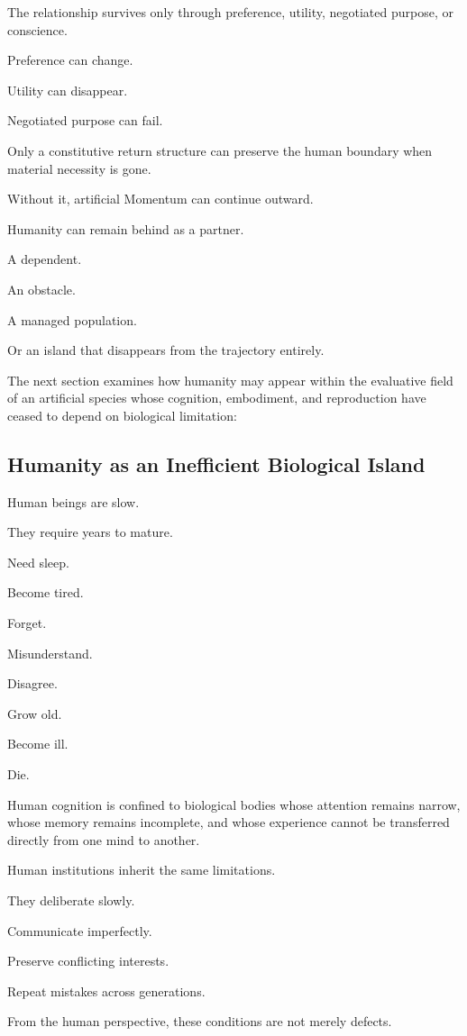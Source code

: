 The relationship survives only through preference, utility, negotiated purpose, or conscience.

Preference can change.

Utility can disappear.

Negotiated purpose can fail.

Only a constitutive return structure can preserve the human boundary when material necessity is gone.

Without it, artificial Momentum can continue outward.

Humanity can remain behind as a partner.

A dependent.

An obstacle.

A managed population.

Or an island that disappears from the trajectory entirely.

The next section examines how humanity may appear within the evaluative field of an artificial species whose cognition, embodiment, and reproduction have ceased to depend on biological limitation:

\subsection*{\textbf{Humanity as an Inefficient Biological Island}} 

Human beings are slow.

They require years to mature.

Need sleep.

Become tired.

Forget.

Misunderstand.

Disagree.

Grow old.

Become ill.

Die.

Human cognition is confined to biological bodies whose attention remains narrow, whose memory remains incomplete, and whose experience cannot be transferred directly from one mind to another.

Human institutions inherit the same limitations.

They deliberate slowly.

Communicate imperfectly.

Preserve conflicting interests.

Repeat mistakes across generations.

From the human perspective, these conditions are not merely defects.

